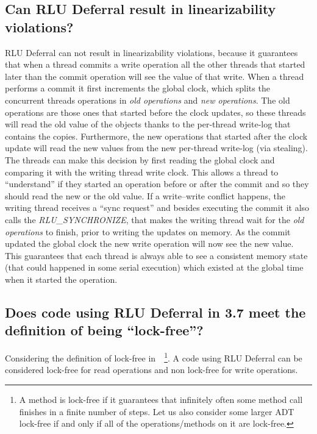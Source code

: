 \begin{refsection}
\subsection*{Can RLU Deferral result in linearizability violations?}
\label{sec:member43}
\vspace{-5pt}
RLU Deferral can not result in linearizability violations, because it
guarantees that when a thread commits a write operation all the other threads
that started later than the commit operation will see the value of that write.
%
When a thread performs a commit it first increments the global clock,
which splits the concurrent threads operations in \emph{old operations} and
\emph{new operations}.
%
The old operations are those ones that started before the clock updates, so
these threads will read the old value of the objects thanks to the
per-thread write-log that contains the copies.
%
Furthermore, the new operations that started after the clock update will read
the new values from the new per-thread write-log (via stealing).
%
The threads can make this decision by first reading the global clock and
comparing it with the writing thread write clock.
%
This allows a thread to ``understand'' if they started an operation before or
after the commit and so they should read the new or the old value.
%
If a write--write conflict happens, the writing thread receives a ``sync
request'' and besides executing the commit it also calls the
\emph{RLU\_SYNCHRONIZE}, that makes the writing thread wait for the \emph{old
  operations} to finish, prior to writing the updates on memory.
%
As the commit updated the global clock the new write operation will now see
the new value.
%
This guarantees that each thread is always able to see a consistent memory
state (that could happened in some serial execution) which existed at the
global time when it started the operation.

\subsection*{Does code using RLU Deferral in 3.7 meet the definition of being
  ``lock-free''?}
\label{sec:member44}

\vspace{-5pt}
Considering the definition of lock-free
in~\cite{Herlihy:2008:AMP:1734069}~\footnote{A method is lock-free if it
  guarantees that infinitely often some method call finishes in a finite
  number of steps.
  Let us also consider some larger ADT lock-free if and only if all of the
  operations/methods on it are lock-free.}.
%
A code using RLU Deferral can be considered lock-free for read operations and
non lock-free for write operations.


\end{refsection}
